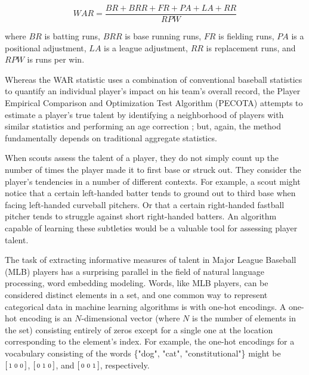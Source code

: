 \documentclass{article}
\begin{document}
\begin{equation}
\label{eqn:war}
WAR = \frac{BR + BRR + FR + PA + LA + RR}{RPW}
\end{equation}

where $BR$ is batting runs, $BRR$ is base running runs, $FR$ is fielding runs, $PA$ is a positional adjustment, $LA$ is a league adjustment, $RR$ is replacement runs, and $RPW$ is runs per win.

Whereas the WAR statistic uses a combination of conventional baseball statistics to quantify an individual player's impact on his team's overall record, the Player Empirical Comparison and Optimization Test Algorithm (PECOTA) attempts to estimate a player's true talent by identifying a neighborhood of players with similar statistics and performing an age correction \parencite{PECOTA}; but, again, the method fundamentally depends on traditional aggregate statistics.

When scouts assess the talent of a player, they do not simply count up the number of times the player made it to first base or struck out. They consider the player's tendencies in a number of different contexts. For example, a scout might notice that a certain left-handed batter tends to ground out to third base when facing left-handed curveball pitchers. Or that a certain right-handed fastball pitcher tends to struggle against short right-handed batters. An algorithm capable of learning these subtleties would be a valuable tool for assessing player talent.

The task of extracting informative measures of talent in Major League Baseball (MLB) players has a surprising parallel in the field of natural language processing, word embedding modeling. Words, like MLB players, can be considered distinct elements in a set, and one common way to represent categorical data in machine learning algorithms is with one-hot encodings. A one-hot encoding is an $N$-dimensional vector (where $N$ is the number of elements in the set) consisting entirely of zeros except for a single one at the location corresponding to the element's index. For example, the one-hot encodings for a vocabulary consisting of the words \{"dog", "cat", "constitutional"\} might be $\begin{bsmallmatrix} 1 & 0 & 0 \end{bsmallmatrix}$, $\begin{bsmallmatrix} 0 & 1 & 0 \end{bsmallmatrix}$, and $\begin{bsmallmatrix} 0 & 0 & 1 \end{bsmallmatrix}$, respectively.
\end{document}
